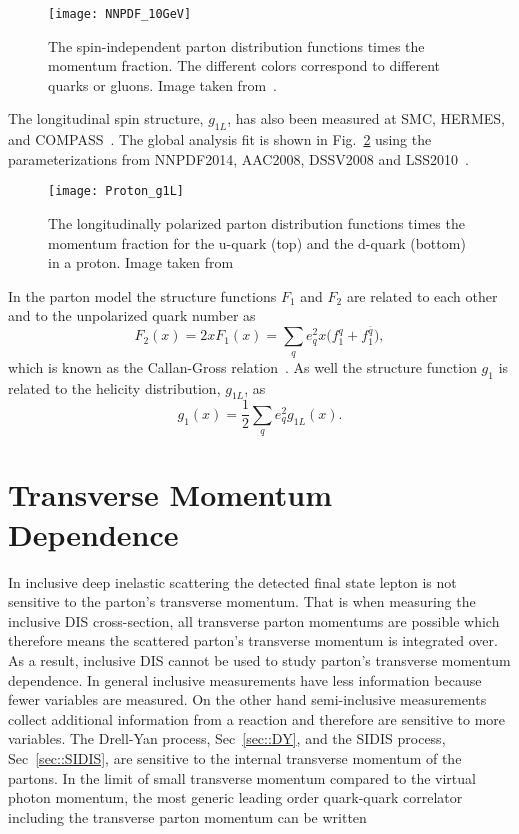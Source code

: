 \begin{figure}[h!t]
  \centering \texttt{[image: NNPDF\_10GeV]}
  \caption{The spin-independent parton distribution functions times the momentum
    fraction.  The different colors correspond to different quarks or gluons.
    Image taken from~\cite{Tanabashi:2018oca}.}
  \label{fig::NNPDF_10GeV}
\end{figure}

The longitudinal spin structure, $g_{1L}$, has also been measured at SMC,
HERMES, and COMPASS~\cite{Adeva:1997is,PhysRevLett.92.012005,Savin:2011zz}.  The
global analysis fit is shown in Fig.~\ref{fig::Proton_g1L} using the
parameterizations from NNPDF2014, AAC2008, DSSV2008 and
LSS2010~\cite{Harland-Lang:2016yfn,Abt:2016vjh,Nocera:2014gqa,Hirai:2008aj}.

\begin{figure}[h!t]
  \centering \texttt{[image: Proton\_g1L]}
  \caption{The longitudinally polarized parton distribution functions times the
    momentum fraction for the u-quark (top) and the d-quark (bottom) in a
    proton.  Image taken from~\cite{Tanabashi:2018oca}}
  \label{fig::Proton_g1L}
\end{figure}

In the parton model the structure functions $F_1$ and $F_2$ are related to each
other and to the unpolarized quark number as
\begin{equation}
  F_2(x) = 2xF_1(x) = \sum_q e_q^2x\Big(f^q_1 + f^{\bar{q}}_1 \Big),
\end{equation}
which is known as the Callan-Gross relation~\cite{PhysRevLett.22.156}.  As well
the structure function $g_1$ is related to the helicity distribution, $g_{1L}$,
as
\begin{equation}
  g_1(x) = \frac{1}{2} \sum_q e^2_q g_{1L}(x).
  \label{equ::g1_g1l_relation}
\end{equation}


\section{Transverse Momentum Dependence}
In inclusive deep inelastic scattering the detected final state lepton is not
sensitive to the parton's transverse momentum.  That is when measuring the
inclusive DIS cross-section, all transverse parton momentums are possible which
therefore means the scattered parton's transverse momentum is integrated over.
As a result, inclusive DIS cannot be used to study parton's transverse momentum
dependence.  In general inclusive measurements have less information because
fewer variables are measured.  On the other hand semi-inclusive measurements
collect additional information from a reaction and therefore are sensitive to
more variables.  The Drell-Yan process, Sec~\ref{sec::DY}, and the SIDIS
process, Sec~\ref{sec::SIDIS}, are sensitive to the internal transverse momentum
of the partons.  In the limit of small transverse momentum compared to the
virtual photon momentum, the most generic leading order quark-quark correlator
including the transverse parton momentum can be
written~\cite{Mulders:1995dh,Boer:1997nt,Bacchetta:2006tn}

